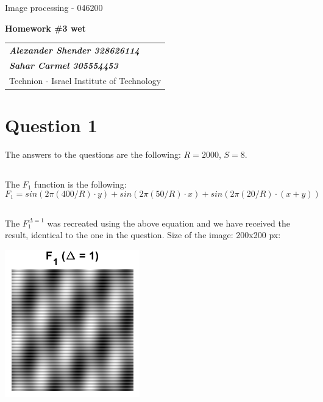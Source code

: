 \documentclass[a4paper]{iacas}
\begin{document}
\begin{center}
 \large Image processing - 046200
 \end{center}
\begin{center}
\large\textbf{Homework \#3 wet}
 \end{center}


\begin{tabular}{l}
\\
{\bf\textit{Alexander Shender 328626114}} \\
{\bf\textit{Sahar Carmel 305554453}} \\
Technion - Israel Institute of Technology
\end{tabular}


\newpage
\section{Question 1}
The answers to the questions are the following: $R=2000$, $S = 8$.
\subsection{}
The $F_{1}$ function is the following:
\begin{equation*}
F_{1} = sin(2\pi(400/R)\cdot y) + sin(2\pi(50/R)\cdot x) + sin(2\pi(20/R)\cdot (x+y))
\end{equation*}
\subsection{}
The $F_{1}^{\Delta=1}$ was recreated using the above equation and we have received the result, identical to the one in the question. Size of the image: 200x200 px:

\vskip 0.1in
\begin{minipage}{0.5\textwidth}
\centering
	\includegraphics[scale=1]{imgs/q1_1.png}
\end{minipage}
\vskip 0.1in
\end{document}
